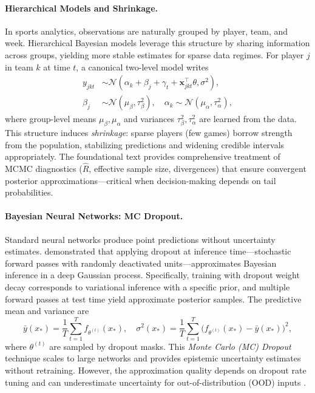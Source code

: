 \paragraph{Hierarchical Models and Shrinkage.}
In sports analytics, observations are naturally grouped by player, team, and week. Hierarchical Bayesian models \citep{gelman2013} leverage this structure by sharing information across groups, yielding more stable estimates for sparse data regimes. For player $j$ in team $k$ at time $t$, a canonical two-level model writes
\begin{align}
y_{jkt} &\sim \mathcal{N}(\alpha_k + \beta_j + \gamma_t + \mathbf{x}_{jkt}^\top \theta, \sigma^2), \\
\beta_j &\sim \mathcal{N}(\mu_\beta, \tau_\beta^2), \quad \alpha_k \sim \mathcal{N}(\mu_\alpha, \tau_\alpha^2),
\end{align}
where group-level means $\mu_\beta, \mu_\alpha$ and variances $\tau_\beta^2, \tau_\alpha^2$ are learned from the data. This structure induces \emph{shrinkage}: sparse players (few games) borrow strength from the population, stabilizing predictions and widening credible intervals appropriately. The foundational text \citet{gelman2013} provides comprehensive treatment of MCMC diagnostics ($\hat{R}$, effective sample size, divergences) that ensure convergent posterior approximations---critical when decision-making depends on tail probabilities.

\paragraph{Bayesian Neural Networks: MC Dropout.}
Standard neural networks produce point predictions without uncertainty estimates. \citet{gal2016dropout} demonstrated that applying dropout at inference time---stochastic forward passes with randomly deactivated units---approximates Bayesian inference in a deep Gaussian process. Specifically, training with dropout weight decay corresponds to variational inference with a specific prior, and multiple forward passes at test time yield approximate posterior samples. The predictive mean and variance are
\begin{equation}
\bar{y}(x_*) = \frac{1}{T} \sum_{t=1}^T f_{\theta^{(t)}}(x_*), \quad \sigma^2(x_*) = \frac{1}{T} \sum_{t=1}^T \big(f_{\theta^{(t)}}(x_*) - \bar{y}(x_*)\big)^2,
\end{equation}
where $\theta^{(t)}$ are sampled by dropout masks. This \emph{Monte Carlo (MC) Dropout} technique scales to large networks and provides epistemic uncertainty estimates without retraining. However, the approximation quality depends on dropout rate tuning and can underestimate uncertainty for out-of-distribution (OOD) inputs \citep{gal2016dropout}.

